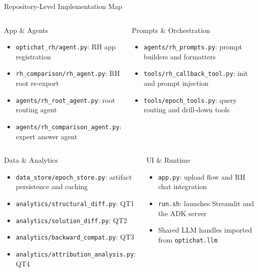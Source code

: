 \documentclass[10pt]{beamer}
\newcommand{\goodbox}[2]{
  \begin{block}{#1}
  #2
  \end{block}
}
\newcommand{\func}[1]{\texttt{#1}}
\begin{document}
\begin{frame}{Repository-Level Implementation Map}
  \scriptsize
  \begin{columns}[T,onlytextwidth]
    \goodbox{App \& Agents}{
      \begin{itemize}
        \item \func{optichat\_rh/agent.py}: RH app registration
        \item \func{rh\_comparison/rh\_agent.py}: RH root re-export
        \item \func{agents/rh\_root\_agent.py}: root routing agent
        \item \func{agents/rh\_comparison\_agent.py}: expert answer agent
      \end{itemize}
    }

    \goodbox{Prompts \& Orchestration}{
      \begin{itemize}
        \item \func{agents/rh\_prompts.py}: prompt builders and formatters
        \item \func{tools/rh\_callback\_tool.py}: init and prompt injection
        \item \func{tools/epoch\_tools.py}: query routing and drill-down tools
      \end{itemize}
    }
  \end{columns}

  \vspace{0.45em}
  \begin{columns}[T,onlytextwidth]
    \goodbox{Data \& Analytics}{
      \begin{itemize}
        \item \func{data\_store/epoch\_store.py}: artifact persistence and caching
        \item \func{analytics/structural\_diff.py}: QT1
        \item \func{analytics/solution\_diff.py}: QT2
        \item \func{analytics/backward\_compat.py}: QT3
        \item \func{analytics/attribution\_analysis.py}: QT4
      \end{itemize}
    }

    \goodbox{UI \& Runtime}{
      \begin{itemize}
        \item \func{app.py}: upload flow and RH chat integration
        \item \func{run.sh}: launches Streamlit and the ADK server
        \item Shared LLM handles imported from \func{optichat.llm}
      \end{itemize}
    }
  \end{columns}
\end{frame}
\end{document}
